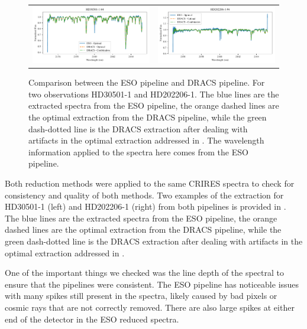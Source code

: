 \begin{figure}
\begin{tabular}{cc}
        \includegraphics[width=0.5\linewidth]{figures/reduction/pipeline_compare/pipeline_compare_HD30501-1_chip_4} & \includegraphics[width=0.5\linewidth]{figures/reduction/pipeline_compare/pipeline_compare_HD202206-1_chip_4}\\
    \end{tabular}
    \caption{Comparison between the ESO pipeline and DRACS pipeline. For two observations HD30501-1 and HD202206-1. The blue lines are the extracted spectra from the ESO pipeline, the orange dashed lines are the optimal extraction from the DRACS pipeline, while the green dash-dotted line is the DRACS extraction after dealing with artifacts in the optimal extraction addressed in . The wavelength information applied to the spectra here comes from the ESO pipeline.}
    \label{fig:reduction-comparsion}
\end{figure}

Both reduction methods were applied to the same CRIRES spectra to check for consistency and quality of both methods. Two examples of the extraction for HD30501-1 (left) and HD202206-1 (right) from both pipelines is provided in . The blue lines are the extracted spectra from the ESO pipeline, the orange dashed lines are the optimal extraction from the DRACS pipeline, while the green dash-dotted line is the DRACS extraction after dealing with artifacts in the optimal extraction addressed in . 

One of the important things we checked was the line depth of the spectral to ensure that the pipelines were consistent. The ESO pipeline has noticeable issues with many spikes still present in the spectra, likely caused by bad pixels or cosmic rays that are not correctly removed. There are also large spikes at either end of the detector in the ESO reduced spectra.  

